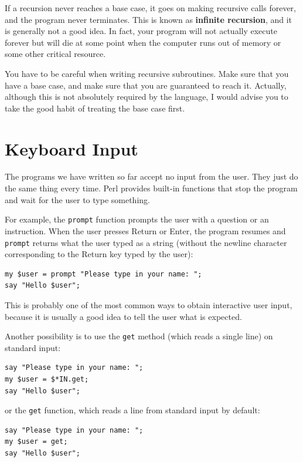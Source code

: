 If a recursion never reaches a base case, it goes on making
recursive calls forever, and the program never terminates.  This is
known as {\bf infinite recursion}, and it is generally not
a good idea. In fact, your program will not actually execute 
forever but will die at some point when the computer runs out of 
memory or some other critical resource.

You have to be careful when writing recursive subroutines. 
Make sure that you have a base case, and make sure that 
you are guaranteed to reach it. Actually, although this is not 
absolutely required by the language, I would advise you to 
take the good habit of treating the base case first.


\section{Keyboard Input}

The programs we have written so far accept no input from 
the user. They just do the same thing every time. Perl 
provides built-in functions that stop the program and
wait for the user to type something. 

For example, the {\tt prompt} function prompts the user with 
a question or an instruction. When the user presses 
{\sf Return} or {\sf Enter}, the program resumes and 
\verb"prompt" returns what the user typed as a string 
(without the newline character corresponding to the 
{\sf Return} key typed by the user):

\begin{verbatim}
my $user = prompt "Please type in your name: ";
say "Hello $user";
\end{verbatim}
%

This is probably one of the most common ways to obtain 
interactive user input, because it is usually a good idea 
to tell the user what is expected.

Another possibility is to use the {\tt get} method (which
 reads a single line) on standard input:

\begin{verbatim}
say "Please type in your name: ";
my $user = $*IN.get;
say "Hello $user";
\end{verbatim}
%
or the {\tt get} function, which reads a line from standard 
input by default:
\begin{verbatim}
say "Please type in your name: ";
my $user = get;
say "Hello $user";
\end{verbatim}
%

